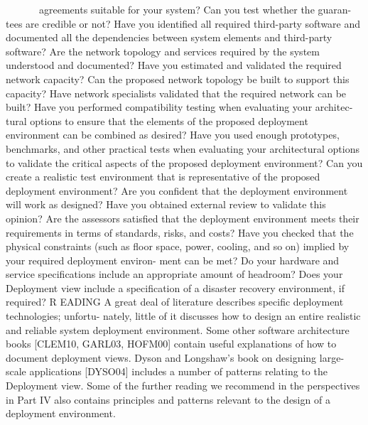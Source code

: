 agreements suitable for your system? Can you test whether the guaran-
tees are credible or not?
Have you identified all required third-party software and documented all
the dependencies between system elements and third-party software?
Are the network topology and services required by the system understood
and documented?
Have you estimated and validated the required network capacity? Can
the proposed network topology be built to support this capacity?
Have network specialists validated that the required network can be built?
Have you performed compatibility testing when evaluating your architec-
tural options to ensure that the elements of the proposed deployment
environment can be combined as desired?
Have you used enough prototypes, benchmarks, and other practical tests
when evaluating your architectural options to validate the critical aspects
of the proposed deployment environment?
Can you create a realistic test environment that is representative of the
proposed deployment environment?
Are you confident that the deployment environment will work as
designed? Have you obtained external review to validate this opinion?
Are the assessors satisfied that the deployment environment meets their
requirements in terms of standards, risks, and costs?
Have you checked that the physical constraints (such as floor space,
power, cooling, and so on) implied by your required deployment environ-
ment can be met?
Do your hardware and service specifications include an appropriate
amount of headroom?
Does your Deployment view include a specification of a disaster recovery
environment, if required?
R EADING
A great deal of literature describes specific deployment technologies; unfortu-
nately, little of it discusses how to design an entire realistic and reliable system
deployment environment. Some other software architecture books [CLEM10,
GARL03, HOFM00] contain useful explanations of how to document deployment
views. Dyson and Longshaw’s book on designing large-scale applications
[DYSO04] includes a number of patterns relating to the Deployment view. Some
of the further reading we recommend in the perspectives in Part IV also contains
principles and patterns relevant to the design of a deployment environment.